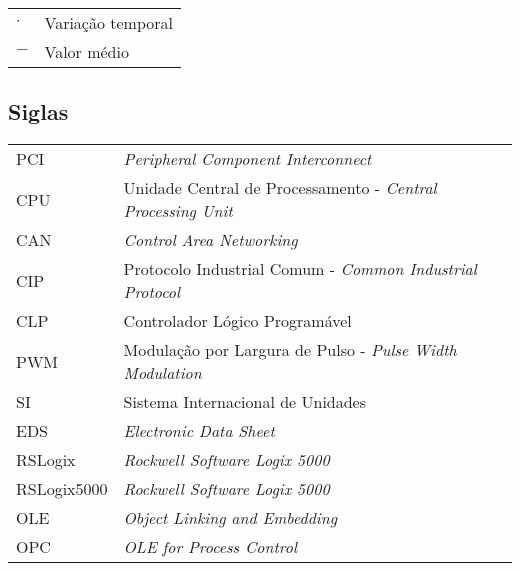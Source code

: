 \begin{tabular}{p{}p{}}
$\cdot$  & Variação temporal \tabularnewline
$-$  & Valor médio \tabularnewline
\end{tabular}


\subsection*{Siglas}

\begin{tabular}{p{}p{}}
PCI  & \textit{Peripheral Component Interconnect}\tabularnewline
CPU & Unidade Central de Processamento - \textit{Central Processing Unit} \tabularnewline
CAN & \textit{Control Area Networking} \tabularnewline
CIP & Protocolo Industrial Comum - \textit{Common Industrial Protocol} \tabularnewline
CLP & Controlador Lógico Programável\tabularnewline
PWM &  Modulação por Largura de Pulso - \textit{Pulse Width Modulation}\tabularnewline
SI & Sistema Internacional de Unidades \tabularnewline
EDS & \textit{Electronic Data Sheet}
\tabularnewline
RSLogix & \textit{Rockwell Software Logix 5000}
\tabularnewline
RSLogix5000 & \textit{Rockwell Software Logix 5000}
\tabularnewline
OLE & \textit{Object Linking and Embedding}\tabularnewline
OPC & \textit{OLE for Process Control}\tabularnewline
\end{tabular}
